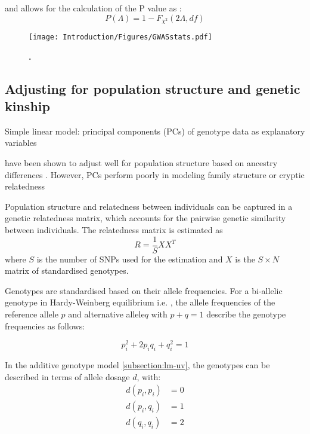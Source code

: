 \noindent and allows for the calculation of the P value as :
\begin{equation}
P(\Lambda) = 1 - F_{\chi^2}(2\Lambda, df)
\label{eq:pvalue}
\end{equation}

\begin{figure}[hbtp]
	\centering
	\texttt{[image: Introduction/Figures/GWASstats.pdf]}
	\caption[\textbf{.}]{\textbf{.} } 
	 	\label{fig:GWAs-stats}
\end{figure}

\subsection{Adjusting for population structure and genetic kinship}
\label{subsection:population-structure}
Simple linear model: principal components (PCs) of genotype data \citep{Price2006} as explanatory variables

have been shown to adjust well for population structure based on ancestry differences \citep{Patterson2006}. However, PCs perform poorly in modeling family structure or cryptic relatedness 

Population structure and relatedness between individuals can be captured in a genetic relatedness matrix, which accounts for the pairwise genetic similarity between individuals. The relatedness matrix is estimated as
 \begin{equation}
 R = \frac{1}{S}XX^T
 \label{eq:relatedness}
 \end{equation}
 where \(S\) is the number of SNPs used for the estimation and \(X\) is the \(S \times N\) matrix of standardised genotypes. 

Genotypes are standardised based on their allele frequencies. For a bi-allelic genotype in Hardy-Weinberg equilibrium i.e. , the allele frequencies of the reference allele \(p\) and alternative allele\(q\) with \(p + q =1\) describe the genotype frequencies as follows:

\begin{equation}
p_i^2 + 2p_iq_i + q_i^2 = 1
\end{equation} 

In the additive genotype model \cref{subsection:lm-uv}, the genotypes can be described in terms of allele dosage \(d\), with:
\begin{align}
d(p_i,p_i) &= 0 \\
d(p_i,q_i) &= 1 \\
d(q_i,q_i) &= 2 \\
\end{align} 

